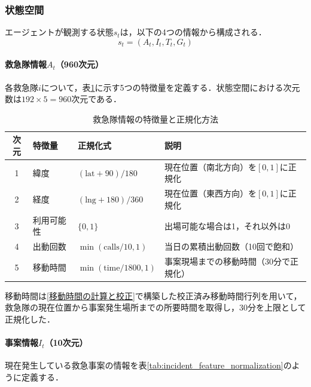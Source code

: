 \subsubsection{状態空間}
エージェントが観測する状態$s_t$は，以下の4つの情報から構成される．
\begin{equation}
s_t = ( A_t, I_t, T_t, G_t )
\end{equation}

\paragraph{救急隊情報$A_t$（960次元）}

各救急隊$i$について，表\ref{tab:feature_normalization}に示す5つの特徴量を定義する．状態空間における次元数は$192 \times 5 = 960$次元である．

\begin{table}[H]
\centering
\caption{救急隊情報の特徴量と正規化方法}
\label{tab:feature_normalization}
\begin{tabularx}{\linewidth}{cllX}
\hline
次元 & 特徴量 & 正規化式 & 説明 \\
\hline
1 & 緯度 & $(\mathrm{lat} + 90) / 180$ & 現在位置（南北方向）を$[0, 1]$に正規化 \\
2 & 経度 & $(\mathrm{lng} + 180) / 360$ & 現在位置（東西方向）を$[0, 1]$に正規化 \\
3 & 利用可能性 & $\{0, 1\}$ & 出場可能な場合は1，それ以外は0 \\
4 & 出動回数 & $\min(\mathrm{calls} / 10, 1)$ & 当日の累積出動回数（10回で飽和） \\
5 & 移動時間 & $\min(\mathrm{time} / 1800, 1)$ & 事案現場までの移動時間（30分で正規化） \\
\hline
\end{tabularx}
\end{table}

移動時間は\ref{移動時間の計算と校正}で構築した校正済み移動時間行列を用いて，救急隊の現在位置から事案発生場所までの所要時間を取得し，30分を上限として正規化した．

\paragraph{事案情報$I_t$（10次元）}

現在発生している救急事案の情報を表\ref{tab:incident_feature_normalization}のように定義する．

